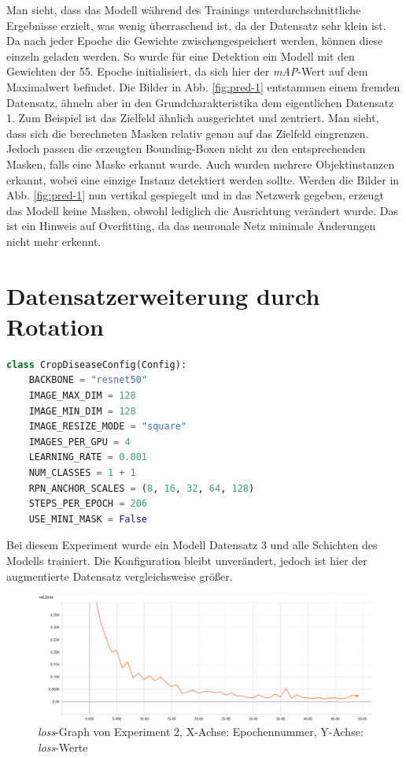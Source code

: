 \noindent
Man sieht, dass das Modell während des Trainings unterdurchschnittliche Ergebnisse erzielt, was wenig überraschend ist, da der Datensatz sehr klein ist. Da nach jeder Epoche die Gewichte zwischengespeichert werden, können diese einzeln geladen werden. So wurde für eine Detektion ein Modell mit den Gewichten der 55. Epoche initialisiert, da sich hier der \textit{mAP}-Wert auf dem Maximalwert befindet. Die Bilder in Abb. \ref{fig:pred-1} entstammen einem fremden Datensatz, ähneln aber in den Grundcharakteristika dem eigentlichen Datensatz 1. Zum Beispiel ist das Zielfeld ähnlich ausgerichtet und zentriert. Man sieht, dass sich die berechneten Masken relativ genau auf das Zielfeld eingrenzen. Jedoch passen die erzeugten Bounding-Boxen nicht zu den entsprechenden Masken, falls eine Maske erkannt wurde. Auch wurden mehrere Objektinstanzen erkannt, wobei eine einzige Instanz detektiert werden sollte. Werden die Bilder in Abb. \ref{fig:pred-1} nun vertikal gespiegelt und in das Netzwerk gegeben, erzeugt das Modell keine Masken, obwohl lediglich die Ausrichtung verändert wurde. Das ist ein Hinweis auf Overfitting, da das neuronale Netz minimale Änderungen nicht mehr erkennt.

\section{Datensatzerweiterung durch Rotation}\label{sub:sub:sec:experiment-2}

\begin{lstlisting}[language=python,caption={Konfiguration für Experiment 2},captionpos=b]
class CropDiseaseConfig(Config):
    BACKBONE = "resnet50"
    IMAGE_MAX_DIM = 128
    IMAGE_MIN_DIM = 128
    IMAGE_RESIZE_MODE = "square"
    IMAGES_PER_GPU = 4
    LEARNING_RATE = 0.001
    NUM_CLASSES = 1 + 1
    RPN_ANCHOR_SCALES = (8, 16, 32, 64, 128)
    STEPS_PER_EPOCH = 206
    USE_MINI_MASK = False
\end{lstlisting}
\noindent
Bei diesem Experiment wurde ein Modell Datensatz 3 und alle Schichten des Modells trainiert. Die Konfiguration bleibt unverändert, jedoch ist hier der augmentierte Datensatz vergleichsweise größer.

\begin{figure}[ht]
	\centering
    \includegraphics[width=.7\textwidth]{pics/val-loss-2.PNG}
    \caption[\textit{loss}-Graph von Experiment 2]{\textit{loss}-Graph von Experiment 2, X-Achse: Epochennummer, Y-Achse: \textit{loss}-Werte}
    \label{fig:val-loss-2}
\end{figure}

